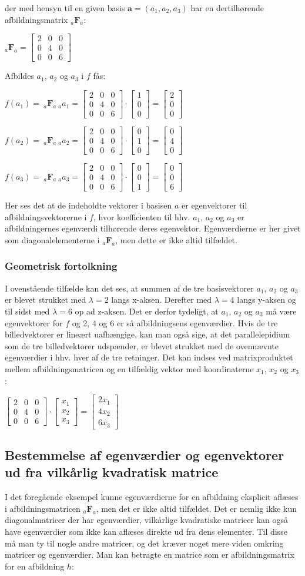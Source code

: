 \documentclass{article}
\newcommand{\cent}[1]{\begin{center}#1\end{center}}
\newcommand{\afb}[3]{\ensuremath{_#1 \textbf{#2}_#3}}
\newcommand{\vek}[3]{\ensuremath{\begin{bmatrix} #1\\ #2\\ #3\end{bmatrix}}}
\newcommand{\mtrix}[9]{\ensuremath{
		\begin{bmatrix}
			#1 & #2 & #3 \\
			#4 & #5 & #6 \\
			#7 & #8 & #9
		\end{bmatrix}}}
\begin{document}
	der med hensyn til en given basis $\textbf{a}=(a_1,a_2,a_3)$ har en dertilhørende afbildningsmatrix \afb{a}{F}{a}:
	
	\cent{$ \afb{a}{F}{a} = \mtrix{2}{0}{0}{0}{4}{0}{0}{0}{6} $}
	Afbildes $a_1$, $a_2$ og $a_3$ i $f$ fås:
	
	\cent{$ f(a_1)=\ \afb{a}{F}{a} \ _a a_1 = \mtrix{2}{0}{0}{0}{4}{0}{0}{0}{6} \cdot \vek{1}{0}{0} = \vek{2}{0}{0} $}
	\cent{$ f(a_2)=\ \afb{a}{F}{a} \ _a a_2 = \mtrix{2}{0}{0}{0}{4}{0}{0}{0}{6} \cdot \vek{0}{1}{0} = \vek{0}{4}{0} $}	
	\cent{$ f(a_3)=\ \afb{a}{F}{a} \ _a a_3 = \mtrix{2}{0}{0}{0}{4}{0}{0}{0}{6} \cdot \vek{0}{0}{1} = \vek{0}{0}{6} $}
	
	Her ses det at de indeholdte vektorer i basisen $a$ er egenvektorer til afbildningsvektorerne i $f$, hvor koefficienten til hhv. $a_1$, $a_2$ og $a_3$ er afbildningernes egenværdi tilhørende deres egenvektor. Egenværdierne er her givet som diagonalelementerne i \afb{a}{F}{a}, men dette er ikke altid tilfældet.
	
	\subsubsection*{Geometrisk fortolkning}
	I ovenstående tilfælde kan det ses, at summen af de tre basisvektorer $ a_1 $, $ a_2 $ og $ a_3 $ er blevet strukket med $\lambda=2$ langs x-aksen. Derefter med $\lambda=4$ langs y-aksen og til sidst med $\lambda=6$ op ad z-aksen. Det er derfor tydeligt, at $a_1$, $a_2$ og $a_3$ må være egenvektorer for $f$ og 2, 4 og 6 er så afbildningsens egenværdier.
	Hvis de tre billedvektorer er lineært uafhængige, kan man også sige, at det parallelepidium som de tre billedvektorer udspænder, er blevet strukket med de ovennævnte egenværdier i hhv. hver af de tre retninger. Det kan indses ved matrixproduktet mellem afbildningsmatricen og en tilfældig vektor med koordinaterne $x_1$, $x_2$ og $x_3$: 
	
	\cent{$ \mtrix{2}{0}{0}{0}{4}{0}{0}{0}{6} \cdot \vek{x_1}{x_2}{x_3} = \vek{2x_1}{4x_2}{6x_3} $}
	
	\subsection*{Bestemmelse af egenværdier og egenvektorer ud fra vilkårlig kvadratisk matrice}
	
	I det foregående eksempel kunne egenværdierne for en afbildning eksplicit aflæses i afbildningsmatricen \afb{a}{F}{a}, men det er ikke altid tilfældet. Det er nemlig ikke kun diagonalmatricer der har egenværdier, vilkårlige kvadratiske matricer kan også have egenværdier som ikke kan aflæses direkte ud fra dens elementer. Til disse må man ty til nogle andre matricer, og det kræver noget mere viden omkring matricer og egenværdier. \newline
	Man kan betragte en matrice som er afbildningsmatrix for en afbildning $h$:
	
\end{document}
